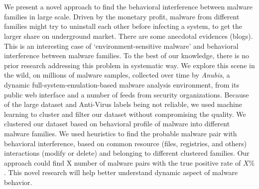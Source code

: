 \chapter{\abstractname}
We present a novel approach to find the behavioral interference between malware families in large scale.
Driven by the monetary profit, malware from different families might try to uninstall each other before infecting a system, to get the larger share on underground market.
There are some anecdotal evidences (blogs).
This is an interesting case of `environment-sensitive malware' and behavioral interference between malware families.
To the best of our knowledge, there is no prior research addressing this problem in systematic way.
We explore this scene in the wild, on millions of malware samples, collected over time by \emph{Anubis}, a dynamic full-system-emulation-based malware analysis environment, from its public web interface and a number of feeds from security organizations.
Because of the large dataset and Anti-Virus labels being not reliable, we used machine learning to cluster and filter our dataset without compromising the quality.
We clustered our dataset based on behavioral profile of malware into different malware families.
We used heuristics to find the probable malware pair with behavioral interference, based on common resource (files, registries, and others) interactions (modify or delete) and belonging to different clustered families.
Our approach could find X number of malware pairs with the true positive rate of $X\%$.
This novel research will help better understand dynamic aspect of malware behavior.

